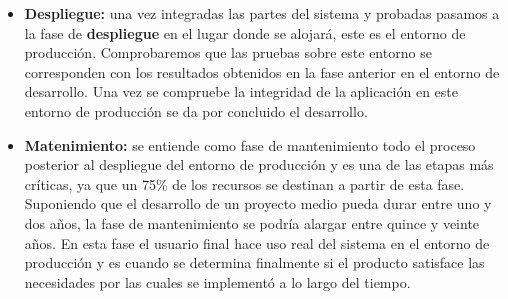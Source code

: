 \begin{itemize}
\item \textbf{Despliegue: } una vez integradas las partes del sistema y probadas pasamos a la fase de \textbf{despliegue} en el lugar donde se alojará, este es el entorno de producción. Comprobaremos que las pruebas sobre este entorno se corresponden con los resultados obtenidos en la fase anterior en el entorno de desarrollo. Una vez se compruebe la integridad de la aplicación en este entorno de producción se da por concluido el desarrollo.
\item \textbf{Matenimiento: } se entiende como fase de mantenimiento todo el proceso posterior al despliegue del entorno de producción y es una de las etapas más críticas, ya que un 75\% de los recursos se destinan a partir de esta fase. Suponiendo que el desarrollo de un proyecto medio pueda durar entre uno y dos años, la fase de mantenimiento se podría alargar entre quince y veinte años. 
\bigskip
En esta fase el usuario final hace uso real del sistema en el entorno de producción y es cuando se determina finalmente si el producto satisface las necesidades por las cuales se implementó a lo largo del tiempo.
\end{itemize}

